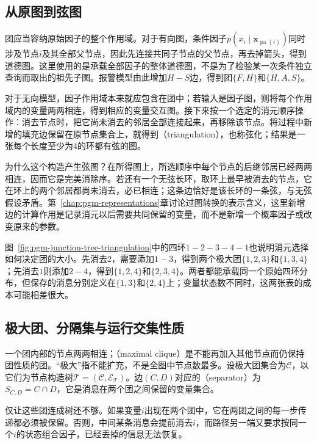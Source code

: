 \subsection{从原图到弦图}
\label{sec:pgm-junction-tree-chordalization}

团应当容纳原始因子的整个作用域。对于有向图，条件因子$p(x_i\mid\bm{x}_{\operatorname{pa}(i)})$同时涉及节点$i$及其全部父节点，因此先连接共同子节点的父节点，再去掉箭头，得到道德图。这里使用的是承载全部因子的整体道德图，不是为了检验某一次条件独立查询而取出的祖先子图。报警模型由此增加$H-S$边，得到团$\{F,H\}$和$\{H,A,S\}$。

对于无向模型，因子作用域本来就应包含在团中；若输入是因子图，则将每个作用域内的变量两两相连，得到相应的变量交互图。接下来按一个选定的消元顺序操作：消去节点时，把它尚未消去的邻居全部连接起来，再移除该节点。将过程中新增的填充边保留在原节点集合上，就得到（triangulation），也称弦化；结果是一张每个长度至少为$4$的环都有弦的图。

为什么这个构造产生弦图？在所得图上，所选顺序中每个节点的后继邻居已经两两相连，因而它是完美消除序。若还有一个无弦长环，取环上最早被消去的节点，它在环上的两个邻居都尚未消去，必已相连；这条边恰好是该长环的一条弦，与无弦假设矛盾。第~\ref{chap:pgm-representations}章讨论过图转换的表示含义，这里新增边的计算作用是记录消元以后需要共同保留的变量，而不是新增一个概率因子或改变原来的参数。

图~\ref{fig:pgm-junction-tree-triangulation}中的四环$1-2-3-4-1$也说明消元选择如何决定团的大小。先消去$2$，需要添加$1-3$，得到两个极大团$\{1,2,3\}$和$\{1,3,4\}$；先消去$1$则添加$2-4$，得到$\{1,2,4\}$和$\{2,3,4\}$。两者都能承载同一个原始四环分布，但保存的消息分别定义在$\{1,3\}$和$\{2,4\}$上；变量状态数不同时，这两张表的成本可能相差很大。

\subsection{极大团、分隔集与运行交集性质}
\label{sec:pgm-junction-tree-running-intersection}

一个团内部的节点两两相连；（maximal clique）是不能再加入其他节点而仍保持团性质的团。“极大”指不能扩充，不是全图中节点数最多。设极大团集合为$\mathcal{C}$，以它们为节点构造树$\mathcal{T}=(\mathcal{C},\mathcal{E}_{\mathcal{T}})$。边$(C,D)$对应的（separator）为$S_{C,D}=C\cap D$，它是消息在两个团之间保留的变量集合。

仅让这些团连成树还不够。如果变量$i$出现在两个团中，它在两团之间的每一步传递都必须被保留。否则，中间某条消息会提前消去$i$，而路径另一端又要求按同一个$i$的状态组合因子，已经丢掉的信息无法恢复。

